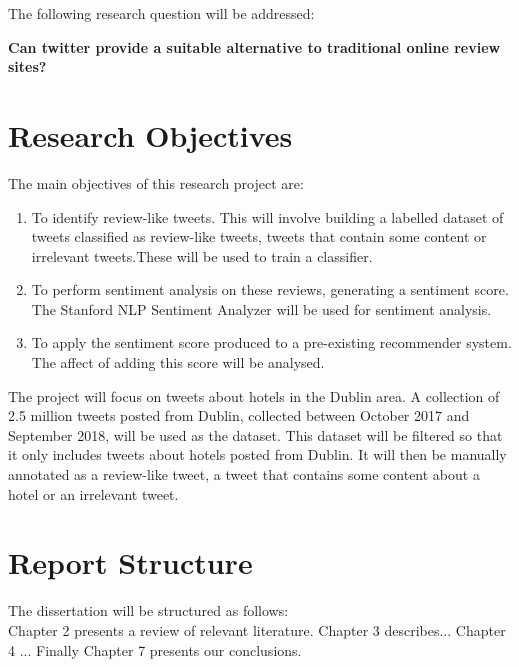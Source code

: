 The following research question will be addressed:

\textbf{Can twitter provide a suitable alternative to traditional online review sites?}\\

\section{Research Objectives}
The main objectives of this research project are:
\begin{enumerate}
    \item To identify review-like tweets. This will involve building a labelled dataset of tweets classified as review-like tweets, tweets that contain some content or irrelevant tweets.These will be used to train a classifier.
    \item To perform sentiment analysis on these reviews, generating a sentiment score. The Stanford NLP Sentiment Analyzer will be used for sentiment analysis. 
    \item To apply the sentiment score produced to a pre-existing recommender system. The affect of adding this score will be analysed.
\end{enumerate}
The project will focus on tweets about hotels in the Dublin area. A collection of 2.5 million tweets posted from Dublin, collected between October 2017 and September 2018, will be used as the dataset. This dataset will be filtered so that it only includes tweets about hotels posted from Dublin. It will then be manually annotated as a review-like tweet, a tweet that contains some content about a hotel or an irrelevant tweet.

\section{Report Structure}
The dissertation will be structured as follows:\\
Chapter 2 presents a review of relevant literature. Chapter 3 describes... Chapter 4 ... Finally Chapter 7 presents our conclusions.